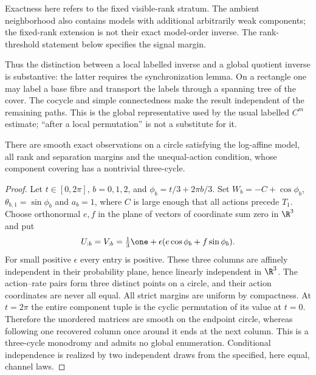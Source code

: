 Exactness here refers to the fixed visible-rank stratum. The ambient
neighborhood also contains models with additional arbitrarily weak
components; the fixed-rank extension is not their exact model-order
inverse. The rank-threshold statement below specifies the signal margin.

Thus the distinction between a local labelled inverse and a global
quotient inverse is substantive: the latter requires the synchronization
lemma. On a rectangle one may label a base fibre and transport the
labels through a spanning tree of the cover. The cocycle and simple
connectedness make the result independent of the remaining paths.
This is the global representative used by the usual labelled $C^m$
estimate; ``after a local permutation'' is not a substitute for it.

\begin{proposition}\label{prop:v83-monodromy}
There are smooth exact observations on a circle satisfying the
log-affine model, all rank and separation margins and the unequal-action
condition, whose component covering has a nontrivial three-cycle.
\end{proposition}
\begin{proof}
Let $t\in[0,2\pi]$, $b=0,1,2$, and
$\phi_b=t/3+2\pi b/3$. Set
$W_b=-C+\cos\phi_b$, $\theta_{b,1}=\sin\phi_b$ and $a_b=1$,
where $C$ is large enough that all actions precede $T_1$.
Choose orthonormal $e,f$ in the plane of vectors of coordinate sum zero
in $\R^3$ and put
\[
 U_{:b}=V_{:b}=\tfrac13\one+
                \epsilon(e\cos\phi_b+f\sin\phi_b).
\]
For small positive $\epsilon$ every entry is positive. These three
columns are affinely independent in their probability plane, hence
linearly independent in $\R^3$. The action--rate pairs form three
distinct points on a circle, and their action coordinates are never
all equal. All strict margins are uniform by compactness.
At $t=2\pi$ the entire component tuple is the cyclic permutation of
its value at $t=0$. Therefore the unordered matrices are smooth on
the endpoint circle, whereas following one recovered column once
around it ends at the next column. This is a three-cycle monodromy
and admits no global enumeration. Conditional independence is realized
by two independent draws from the specified, here equal, channel laws.
\end{proof}

